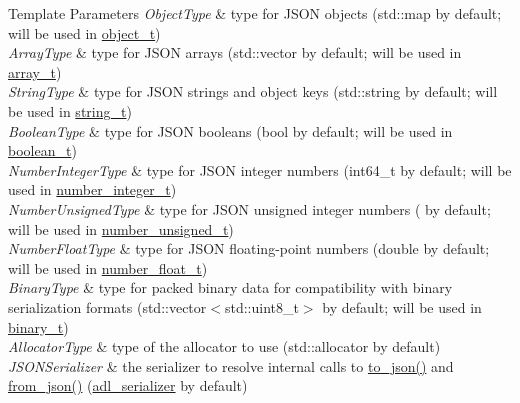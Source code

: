 \begin{DoxyTemplParams}{Template Parameters}
{\em Object\+Type} & type for J\+S\+ON objects ({\ttfamily std\+::map} by default; will be used in \hyperlink{classnlohmann_1_1basic__json_a5e3df077f880583a96d74cd63e173cb2}{object\+\_\+t}) \\
\hline
{\em Array\+Type} & type for J\+S\+ON arrays ({\ttfamily std\+::vector} by default; will be used in \hyperlink{classnlohmann_1_1basic__json_a53700c308d804f84aea5ff05abb2ac4e}{array\+\_\+t}) \\
\hline
{\em String\+Type} & type for J\+S\+ON strings and object keys ({\ttfamily std\+::string} by default; will be used in \hyperlink{classnlohmann_1_1basic__json_a33593865ffb1860323dcbd52425b90c8}{string\+\_\+t}) \\
\hline
{\em Boolean\+Type} & type for J\+S\+ON booleans ({\ttfamily bool} by default; will be used in \hyperlink{classnlohmann_1_1basic__json_a44fd1a12c9c54623c942b430e7a72937}{boolean\+\_\+t}) \\
\hline
{\em Number\+Integer\+Type} & type for J\+S\+ON integer numbers ({\ttfamily int64\+\_\+t} by default; will be used in \hyperlink{classnlohmann_1_1basic__json_a11e390944da90db83089eb2426a749d3}{number\+\_\+integer\+\_\+t}) \\
\hline
{\em Number\+Unsigned\+Type} & type for J\+S\+ON unsigned integer numbers ({} by default; will be used in \hyperlink{classnlohmann_1_1basic__json_ae09af9c23351b7245d9be4d1b2035fef}{number\+\_\+unsigned\+\_\+t}) \\
\hline
{\em Number\+Float\+Type} & type for J\+S\+ON floating-\/point numbers ({\ttfamily double} by default; will be used in \hyperlink{classnlohmann_1_1basic__json_a5b8abaebd922d82d69756327c0c347e6}{number\+\_\+float\+\_\+t}) \\
\hline
{\em Binary\+Type} & type for packed binary data for compatibility with binary serialization formats ({\ttfamily std\+::vector$<$std\+::uint8\+\_\+t$>$} by default; will be used in \hyperlink{classnlohmann_1_1basic__json_ad6c955145bebde84d93991ffed7cd389}{binary\+\_\+t}) \\
\hline
{\em Allocator\+Type} & type of the allocator to use ({\ttfamily std\+::allocator} by default) \\
\hline
{\em J\+S\+O\+N\+Serializer} & the serializer to resolve internal calls to {\ttfamily \hyperlink{namespacenlohmann_1_1detail_aaa77b0c9745130b77733a92a1a2e82ec}{to\+\_\+json()}} and {\ttfamily \hyperlink{namespacenlohmann_1_1detail_aef5c8ea108f4d2b03fb4a635617510de}{from\+\_\+json()}} (\hyperlink{structnlohmann_1_1adl__serializer}{adl\+\_\+serializer} by default)\\
\hline
\end{DoxyTemplParams}

